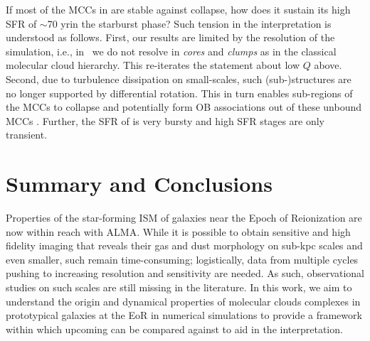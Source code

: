 \IfFileExists{emulateapjlegacy.cls}{\documentclass[iop]{emulateapjlegacy}}{\documentclass[iop]{emulateapj}}
\newcommand{\MM}[1]{({\bf \color{mmcolor} MM: #1})}
\begin{document}
If most of the MCCs in \flower are stable against collapse, 
how does it sustain its high SFR of $\sim$70\,\Msun\,yr\pmOne in the starburst phase? 
Such tension in the interpretation is understood as follows.
%
First, our results are limited by the resolution of the simulation, i.e., in \flower~we do not resolve \SF in {\it cores} and {\it clumps} as in the classical molecular cloud hierarchy. This re-iterates the statement about low $Q$ above.
%
Second, due to turbulence dissipation on small-scales, such
(sub-)structures are no longer supported by differential rotation. 
This in turn enables sub-regions of the MCCs to collapse and potentially form 
OB associations out of these unbound MCCs \citep{Clark04a, Clark05a}.
Further, the SFR of \flower is very bursty and high SFR stages are only transient.


\section{Summary and Conclusions}      \label{sec:conclusion}

Properties of the star-forming ISM of galaxies near the Epoch of Reionization are now within reach with ALMA. 
While it is possible to obtain sensitive and high fidelity imaging that reveals their gas and dust morphology 
on sub-kpc scales and even smaller, such \obs remain time-consuming; logistically, data from multiple cycles pushing to increasing resolution
and sensitivity are needed. As such, observational studies on such scales are still missing in the literature. 
In this work, we aim to understand the origin and dynamical properties of molecular clouds complexes 
in prototypical galaxies at the EoR in numerical simulations 
to provide a framework within which upcoming \obs can be compared against to aid in the interpretation.
\end{document}
